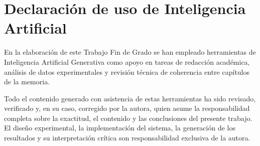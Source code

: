 \documentclass[12pt, a4paper]{book}
\begin{document}
\chapter*{Declaración de uso de Inteligencia Artificial}

En la elaboración de este Trabajo Fin de Grado se han empleado herramientas de
Inteligencia Artificial Generativa como
apoyo en tareas de redacción académica, análisis de datos experimentales y
revisión técnica de coherencia entre capítulos de la memoria.

Todo el contenido generado con asistencia de estas herramientas ha sido
revisado, verificado y, en su caso, corregido por la autora, quien asume la
responsabilidad completa sobre la exactitud, el contenido y las conclusiones
del presente trabajo. El diseño experimental, la implementación del sistema,
la generación de los resultados y su interpretación crítica son responsabilidad
exclusiva de la autora.
\end{document}

